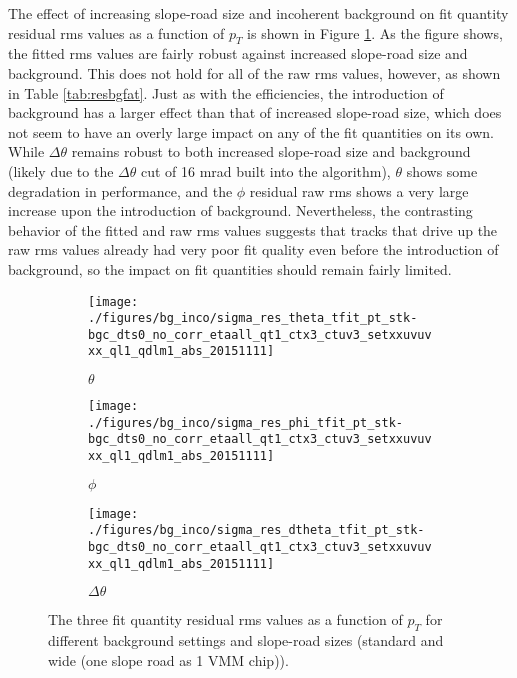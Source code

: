 The effect of increasing slope-road size and incoherent background on fit quantity residual rms values as a function of $p_T$ is shown in Figure \ref{fig:statbg}.  As the figure shows, the fitted rms values are fairly robust against increased slope-road size and background.  This does not hold for all of the raw rms values, however, as shown in Table \ref{tab:resbgfat}.  Just as with the efficiencies, the introduction of background has a larger effect than that of increased slope-road size, which does not seem to have an overly large impact on any of the fit quantities on its own.  While $\Delta\theta$ remains robust to both increased slope-road size and background (likely due to the $\Delta\theta$ cut of 16 mrad built into the algorithm),  $\theta$ shows some degradation in performance, and the $\phi$ residual raw rms shows a very large increase upon the introduction of background.  Nevertheless, the contrasting behavior of the fitted and raw rms values suggests that tracks that drive up the raw rms values already had very poor fit quality even before the introduction of background, so the impact on fit quantities should remain fairly limited.
\begin{figure}[!htbp]\captionsetup{justification=centering}
  \begin{center}
    \begin{subfigure}{0.320\textwidth}\caption{$\theta$}\texttt{[image: ./figures/bg\_inco/sigma\_res\_theta\_tfit\_pt\_stk-bgc\_dts0\_no\_corr\_etaall\_qt1\_ctx3\_ctuv3\_setxxuvuvxx\_ql1\_qdlm1\_abs\_20151111]}\end{subfigure}
    \begin{subfigure}{0.320\textwidth}\caption{$\phi$}\texttt{[image: ./figures/bg\_inco/sigma\_res\_phi\_tfit\_pt\_stk-bgc\_dts0\_no\_corr\_etaall\_qt1\_ctx3\_ctuv3\_setxxuvuvxx\_ql1\_qdlm1\_abs\_20151111]}\end{subfigure}
    \begin{subfigure}{0.320\textwidth}\caption{$\Delta\theta$}\texttt{[image: ./figures/bg\_inco/sigma\_res\_dtheta\_tfit\_pt\_stk-bgc\_dts0\_no\_corr\_etaall\_qt1\_ctx3\_ctuv3\_setxxuvuvxx\_ql1\_qdlm1\_abs\_20151111]}\end{subfigure}
  \caption{\label{fig:statbg} The three fit quantity residual rms values as a function of $p_T$ for different background settings and slope-road sizes (standard and wide (one slope road as 1 VMM chip)).}
  \end{center}
\end{figure}


